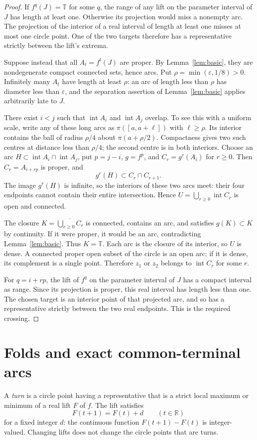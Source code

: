 \documentclass[11pt]{article}
\newcommand{\T}{\mathbb T}
\newcommand{\intr}{\operatorname{int}}
\begin{document}
\begin{proof}
If $f^q(J)=\T$ for some $q$, the range of any lift on the parameter interval of $J$ has length at least one. Otherwise its projection would miss a nonempty arc. The projection of the interior of a real interval of length at least one misses at most one circle point. One of the two targets therefore has a representative strictly between the lift's extrema.

Suppose instead that all $A_t=f^t(J)$ are proper. By Lemma~\ref{lem:basic}, they are nondegenerate compact connected sets, hence arcs. Put $\rho=\min(\varepsilon,1/8)>0$. Infinitely many $A_t$ have length at least $\rho$: an arc of length less than $\rho$ has diameter less than $\varepsilon$, and the separation assertion of Lemma~\ref{lem:basic} applies arbitrarily late to $J$.

There exist $i<j$ such that $\intr A_i$ and $\intr A_j$ overlap. To see this with a uniform scale, write any of these long arcs as $\pi([a,a+\ell])$ with $\ell\ge\rho$. Its interior contains the ball of radius $\rho/4$ about $\pi(a+\rho/2)$. Compactness gives two such centres at distance less than $\rho/4$; the second centre is in both interiors. Choose an arc $H\subset\intr A_i\cap\intr A_j$, put $p=j-i$, $g=f^p$, and $C_r=g^r(A_i)$ for $r\ge0$. Then $C_r=A_{i+rp}$ is proper, and
\[
 g^r(H)\subset C_r\cap C_{r+1}.
\]
The image $g^r(H)$ is infinite, so the interiors of these two arcs meet: their four endpoints cannot contain their entire intersection. Hence $U=\bigcup_{r\ge0}\intr C_r$ is open and connected.

The closure $K=\overline{\bigcup_{r\ge0}C_r}$ is connected, contains an arc, and satisfies $g(K)\subset K$ by continuity. If it were proper, it would be an arc, contradicting Lemma~\ref{lem:basic}. Thus $K=\T$. Each arc is the closure of its interior, so $U$ is dense. A connected proper open subset of the circle is an open arc; if it is dense, its complement is a single point. Therefore $z_1$ or $z_2$ belongs to $\intr C_r$ for some $r$.

For $q=i+rp$, the lift of $f^q$ on the parameter interval of $J$ has a compact interval as range. Since its projection is proper, this real interval has length less than one. The chosen target is an interior point of that projected arc, and so has a representative strictly between the two real endpoints. This is the required crossing.
\end{proof}

\section{Folds and exact common-terminal arcs}
A \emph{turn} is a circle point having a representative that is a strict local maximum or minimum of a real lift $F$ of $f$. The lift satisfies
\[
 F(t+1)=F(t)+d\qquad(t\in\mathbb R)
\]
for a fixed integer $d$: the continuous function $F(t+1)-F(t)$ is integer-valued. Changing lifts does not change the circle points that are turns.
\end{document}
